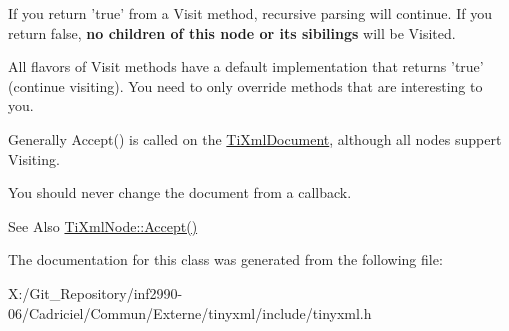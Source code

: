 If you return 'true' from a Visit method, recursive parsing will continue. If you return false, {\bfseries no children of this node or its sibilings} will be Visited.

All flavors of Visit methods have a default implementation that returns 'true' (continue visiting). You need to only override methods that are interesting to you.

Generally Accept() is called on the \hyperlink{class_ti_xml_document}{Ti\-Xml\-Document}, although all nodes suppert Visiting.

You should never change the document from a callback.

\begin{DoxySeeAlso}{See Also}
\hyperlink{class_ti_xml_node_acc0f88b7462c6cb73809d410a4f5bb86}{Ti\-Xml\-Node\-::\-Accept()} 
\end{DoxySeeAlso}


The documentation for this class was generated from the following file\-:\begin{DoxyCompactItemize}
\item 
X\-:/\-Git\-\_\-\-Repository/inf2990-\/06/\-Cadriciel/\-Commun/\-Externe/tinyxml/include/tinyxml.\-h\end{DoxyCompactItemize}
